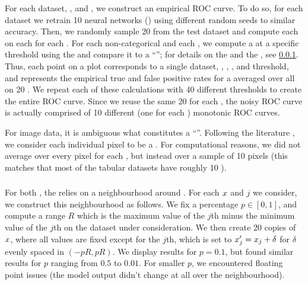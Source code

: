 For each dataset, \fielddefname{}, and \downtaskname{}, we construct an empirical ROC curve.
To do so, for each dataset we retrain 10 neural networks (\modelnames{}) using different random seeds to similar accuracy. Then, we randomly sample 20 \obsnames{} from the test dataset and compute each \fielddefname{} on each \obsname{} for each \modelname{}. For each non-categorical \covname{} and each \downtaskname{}, we compute a \hyptestname{} at a specific threshold using the \covname{} \attname{} and compare it to a ``\groundname{}''; for details on the \hyptestnames{} and the \groundname{}, see \cref{sec:examples-tasks}.
Thus, each point on a plot corresponds to a single dataset, \modelname{}, \fielddefname{}, \downtaskname{}, and \hyptestname{} threshold, and represents the empirical true and false positive rates for a \hyptestname{} averaged over all \covnames{} on 20 \obsnames{}.
We repeat each of these calculations with 40 different \hyptestname{} thresholds to create the entire ROC curve.
Since we reuse the same 20 \obsnames{} for each \modelname{}, the noisy ROC curve is actually comprised of 10 different (one for each \modelname{}) monotonic ROC curves.

For image data, it is ambiguous what constitutes a ``\covname{}''. Following the literature \citep{molnar2022}, we consider each individual pixel to be a \covname{}. For computational reasons, we did not average over every pixel for each \hyptestname{}, but instead over a sample of 10 pixels (this matches that most of the tabular datasets have roughly 10 \covnames{}). 
%
%
%

%
%
%
%
%
%
%

%
%

\subsubsection{\downtaskNAMEs{}}\label{sec:examples-tasks}
%
\paragraph{\groundNAME{}}
For both \downtasknames{}, the \groundname{} relies on a neighbourhood around \obsnames{}. For each \obsname{} $x$ and \covname{} $j$ we consider, we construct this neighbourhood as follows. We fix a percentage $p \in [0,1]$, and compute a range $R$ which is the maximum value of the $j$th \covname{} minus the minimum value of the $j$th \covname{} on the dataset under consideration. We then create 20 copies of $x$, where all \covname{} values are fixed except for the $j$th, which is set to $x'_j = x_j + \delta$ for $\delta$ evenly spaced in $(-pR, pR)$. We display results for $p=0.1$, but found similar results for $p$ ranging from $0.5$ to $0.01$. For smaller $p$, we encountered floating point issues (the model output didn't change at all over the neighbourhood).

